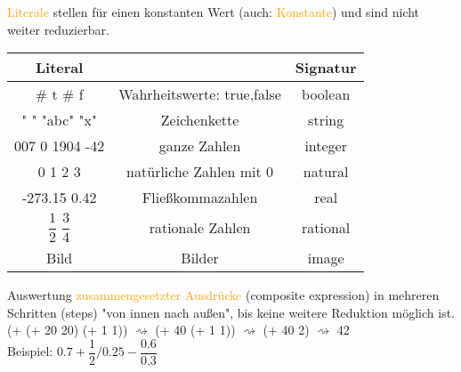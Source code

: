 \documentclass[paper=a4, fontsize=11pt]{scrartcl}
\numberwithin{equation}{section}
\numberwithin{figure}{section}
\numberwithin{table}{section}
\begin{document}
\textcolor{orange}{Literale} stellen für einen konstanten Wert (auch: \textcolor{orange}{Konstante}) und sind nicht weiter reduzierbar. \\
\begin{tabular}{cc|c}
Literal & & Signatur \\\hline
\# t \# f & Wahrheitswerte: true,false & boolean \\
" " "abc" "x" & Zeichenkette & string \\
007 0 1904 -42 & ganze Zahlen & integer \\
0 1 2 3 & natürliche Zahlen mit 0 & natural \\
-273.15 0.42 & Fließkommazahlen & real \\
$\dfrac{1}{2}$ $\dfrac{3}{4}$ & rationale Zahlen & rational \\
Bild & Bilder & image \\
\end{tabular}

Auswertung \textcolor{orange}{zusammengesetzter Ausdrücke} (composite expression) in mehreren Schritten (steps) "von innen nach außen", bis keine weitere Reduktion möglich ist. \\

(+ (+ 20 20) (+ 1 1)) $\rightsquigarrow$ (+ 40 (+ 1 1)) $\rightsquigarrow$ (+ 40 2) $\rightsquigarrow$ 42 \\

Beispiel: $0.7 + \dfrac{1}{2} / 0.25 - \dfrac{0.6}{0.3}$ \\
\end{document}
